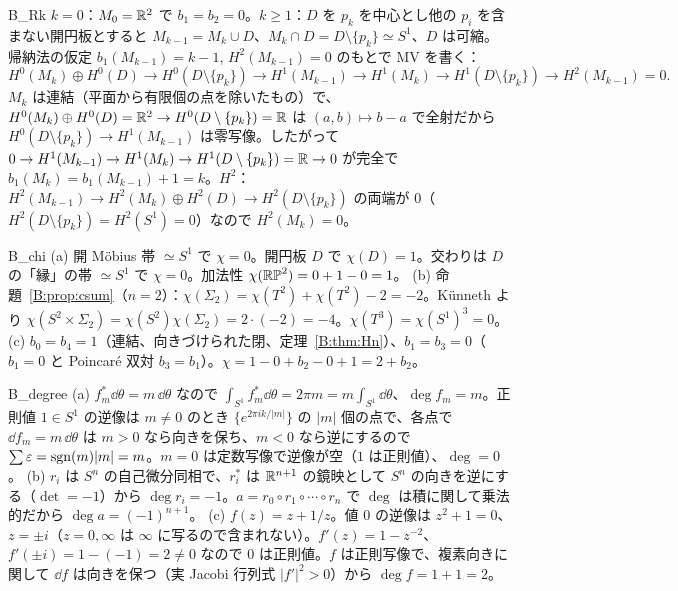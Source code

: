 \begin{soll}{B_Rk}
$k=0$：$M_0=\mathbb R^2$ で $b_1=b_2=0$。$k\ge1$：$D$ を $p_k$ を中心とし他の $p_i$ を含まない開円板とすると $M_{k-1}=M_k\cup D$、$M_k\cap D=D\setminus\{p_k\}\simeq S^1$、$D$ は可縮。帰納法の仮定 $b_1(M_{k-1})=k-1$, $H^2(M_{k-1})=0$ のもとで MV を書く：
\[
H^0(M_k)\oplus H^0(D)\to H^0(D\setminus\{p_k\})\to H^1(M_{k-1})\to H^1(M_k)\to H^1(D\setminus\{p_k\})\to H^2(M_{k-1})=0 .
\]
$M_k$ は連結（平面から有限個の点を除いたもの）で、$H^0(M_k)\oplus H^0(D)=\mathbb R^2\to H^0(D\setminus\{p_k\})=\mathbb R$ は $(a,b)\mapsto b-a$ で全射だから $H^0(D\setminus\{p_k\})\to H^1(M_{k-1})$ は零写像。したがって $0\to H^1(M_{k-1})\to H^1(M_k)\to H^1(D\setminus\{p_k\})=\mathbb R\to0$ が完全で $b_1(M_k)=b_1(M_{k-1})+1=k$。$H^2$：$H^2(M_{k-1})\to H^2(M_k)\oplus H^2(D)\to H^2(D\setminus\{p_k\})$ の両端が $0$（$H^2(D\setminus\{p_k\})=H^2(S^1)=0$）なので $H^2(M_k)=0$。
\end{soll}

\begin{soll}{B_chi}
(a) 開 Möbius 帯 $\simeq S^1$ で $\chi=0$。開円板 $D$ で $\chi(D)=1$。交わりは $D$ の「縁」の帯 $\simeq S^1$ で $\chi=0$。加法性 $\chi(\mathbb{RP}^2)=0+1-0=1$。
(b) 命題~\ref{B:prop:csum}（$n=2$）：$\chi(\Sigma_2)=\chi(T^2)+\chi(T^2)-2=-2$。Künneth より $\chi(S^2\times\Sigma_2)=\chi(S^2)\chi(\Sigma_2)=2\cdot(-2)=-4$。$\chi(T^3)=\chi(S^1)^3=0$。
(c) $b_0=b_4=1$（連結、向きづけられた閉、定理~\ref{B:thm:Hn}）、$b_1=b_3=0$（$b_1=0$ と Poincaré 双対 $b_3=b_1$）。$\chi=1-0+b_2-0+1=2+b_2$。
\end{soll}

\begin{soll}{B_degree}
(a) $f_m^*\dd\theta=m\,\dd\theta$ なので $\int_{S^1}f_m^*\dd\theta=2\pi m=m\int_{S^1}\dd\theta$、$\deg f_m=m$。正則値 $1\in S^1$ の逆像は $m\ne0$ のとき $\{e^{2\pi ik/|m|}\}$ の $|m|$ 個の点で、各点で $\dd f_m=m\,\dd\theta$ は $m>0$ なら向きを保ち、$m<0$ なら逆にするので $\sum\varepsilon=\operatorname{sgn}(m)|m|=m$。$m=0$ は定数写像で逆像が空（$1$ は正則値）、$\deg=0$。
(b) $r_i$ は $S^n$ の自己微分同相で、$r_i^*$ は $\mathbb R^{n+1}$ の鏡映として $S^n$ の向きを逆にする（$\det=-1$）から $\deg r_i=-1$。$a=r_0\circ r_1\circ\cdots\circ r_n$ で $\deg$ は積に関して乗法的だから $\deg a=(-1)^{n+1}$。
(c) $f(z)=z+1/z$。値 $0$ の逆像は $z^2+1=0$、$z=\pm i$（$z=0,\infty$ は $\infty$ に写るので含まれない）。$f'(z)=1-z^{-2}$、$f'(\pm i)=1-(-1)=2\ne0$ なので $0$ は正則値。$f$ は正則写像で、複素向きに関して $\dd f$ は向きを保つ（実 Jacobi 行列式 $|f'|^2>0$）から $\deg f=1+1=2$。
\end{soll}

